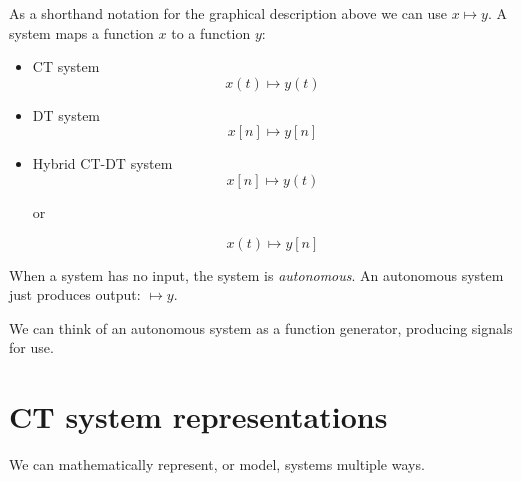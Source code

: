As a shorthand notation for the graphical description above we can use $x \mapsto y$. A system maps  a function $x$ to a function $y$:

\begin{itemize}
\item CT system
  \[
  x(t) \mapsto y(t)
  \]
  
\item DT system
  \[
  x[n] \mapsto y[n]
  \]
\item Hybrid CT-DT system
  \[
  x[n] \mapsto y(t)
  \]
  \begin{center}
    or
  \end{center}
  \[
  x(t) \mapsto y[n]
  \]
\end{itemize}

When a system has no input, the system is {\it autonomous}. An autonomous system just produces output: $\mapsto y$.

\begin{center}
\end{center}

We can think of an autonomous system as a function generator, producing signals for use.

\section{CT system representations}

We can mathematically represent, or model, systems multiple ways.

